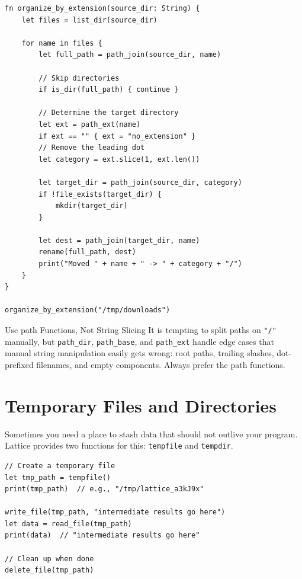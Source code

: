 \begin{lstlisting}[language=Lattice, caption={Organizing files by extension}]
fn organize_by_extension(source_dir: String) {
    let files = list_dir(source_dir)

    for name in files {
        let full_path = path_join(source_dir, name)

        // Skip directories
        if is_dir(full_path) { continue }

        // Determine the target directory
        let ext = path_ext(name)
        if ext == "" { ext = "no_extension" }
        // Remove the leading dot
        let category = ext.slice(1, ext.len())

        let target_dir = path_join(source_dir, category)
        if !file_exists(target_dir) {
            mkdir(target_dir)
        }

        let dest = path_join(target_dir, name)
        rename(full_path, dest)
        print("Moved " + name + " -> " + category + "/")
    }
}

organize_by_extension("/tmp/downloads")
\end{lstlisting}

\begin{tipbox}{Use path Functions, Not String Slicing}
It is tempting to split paths on \texttt{"/"} manually, but
\lstinline|path_dir|, \lstinline|path_base|, and \lstinline|path_ext| handle
edge cases that manual string manipulation easily gets wrong: root paths,
trailing slashes, dot-prefixed filenames, and empty components. Always prefer
the path functions.
\end{tipbox}

\section{Temporary Files and Directories}\label{sec:tempfiles}


Sometimes you need a place to stash data that should not outlive your program.
Lattice provides two functions for this: \lstinline|tempfile| and
\lstinline|tempdir|.

\begin{lstlisting}[language=Lattice, caption={Creating temporary files and directories}]
// Create a temporary file
let tmp_path = tempfile()
print(tmp_path)  // e.g., "/tmp/lattice_a3kJ9x"

write_file(tmp_path, "intermediate results go here")
let data = read_file(tmp_path)
print(data)  // "intermediate results go here"

// Clean up when done
delete_file(tmp_path)
\end{lstlisting}

